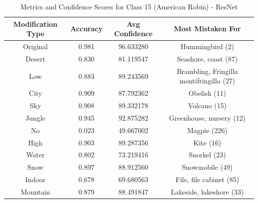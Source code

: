 \begin{table}
	\centering
	\begin{tabular}{|c|c|c|c|}
		\hline
		\textbf{Modification Type} & \textbf{Accuracy} & \textbf{Avg Confidence} & \textbf{Most Mistaken For} \\
		\hline
		Original & 0.981 & 96.633280 & Hummingbird (2) \\
		\hline
		Desert & 0.830 & 81.119547 & Seashore, coast (87) \\
		\hline
		Low & 0.883 & 89.243569 & Brambling, Fringilla montifringilla (27) \\
		\hline
		City & 0.909 & 87.792362 & Obelisk (11) \\
		\hline
		Sky & 0.908 & 89.332178 & Volcano (15) \\
		\hline
		Jungle & 0.945 & 92.875282 & Greenhouse, nursery (12) \\
		\hline
		No & 0.023 & 49.667002 & Magpie (226) \\
		\hline
		High & 0.903 & 89.287356 & Kite (16) \\
		\hline
		Water & 0.802 & 73.219416 & Snorkel (23) \\
		\hline
		Snow & 0.897 & 88.912560 & Snowmobile (49) \\
		\hline
		Indoor & 0.678 & 69.680563 & File, file cabinet (85) \\
		\hline
		Mountain & 0.879 & 88.491847 & Lakeside, lakeshore (33) \\
		\hline
	\end{tabular}
	\caption{Metrics and Confidence Scores for Class 15 (American Robin) - ResNet}
	\label{tab:metrics_confidence_class_15_resnet}
\end{table}

